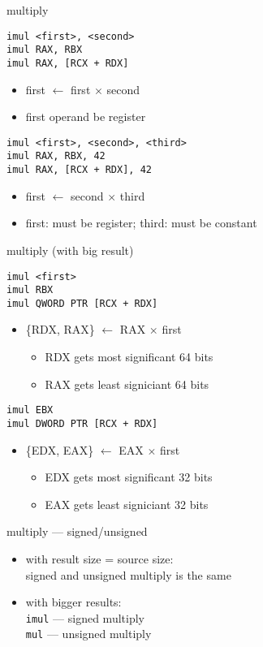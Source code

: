 \begin{frame}[fragile,label=mult]{multiply}
\begin{lstlisting}
imul <first>, <second>
imul RAX, RBX
imul RAX, [RCX + RDX]
\end{lstlisting}
\begin{itemize}
\item first $\leftarrow$ first $\times$ second
\item first operand  be register
\end{itemize}
\begin{lstlisting}
imul <first>, <second>, <third>
imul RAX, RBX, 42
imul RAX, [RCX + RDX], 42
\end{lstlisting}
\begin{itemize}
\item first $\leftarrow$ second $\times$ third
\item first: must be register; third: must be constant
\end{itemize}
\end{frame}

\begin{frame}[fragile,label=bigMult]{multiply (with big result)}
\begin{lstlisting}
imul <first>
imul RBX
imul QWORD PTR [RCX + RDX]
\end{lstlisting}
\begin{itemize}
\item \{RDX, RAX\} $\leftarrow$ RAX $\times$ first
\begin{itemize}
\item RDX gets most significant 64 bits
\item RAX gets least signiciant 64 bits
\end{itemize}
\end{itemize}
\begin{lstlisting}
imul EBX
imul DWORD PTR [RCX + RDX]
\end{lstlisting}
\begin{itemize}
\item \{EDX, EAX\} $\leftarrow$ EAX $\times$ first
\begin{itemize}
\item EDX gets most significant 32 bits
\item EAX gets least signiciant 32 bits
\end{itemize}
\end{itemize}
\end{frame}

\begin{frame}{multiply --- signed/unsigned}
\begin{itemize}
\item with result size = source size: \\
signed and unsigned multiply is the same
\item with bigger results: \\
\texttt{imul} --- signed multiply \\
\texttt{mul} --- unsigned multiply
\end{itemize}
\end{frame}

